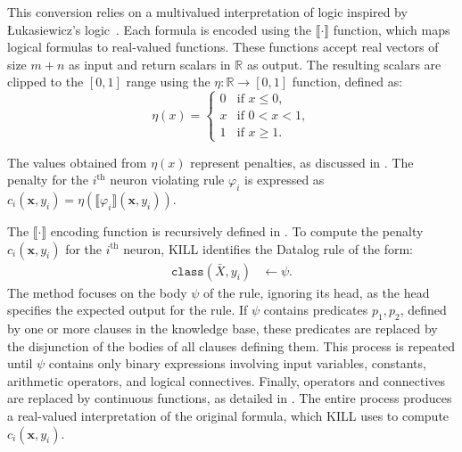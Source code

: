 This conversion relies on a multivalued interpretation of logic inspired by \L{}ukasiewicz's logic~\cite{DBLP:journals/jsyml/Hay63}.
%
Each formula is encoded using the \(\llbracket \cdot \rrbracket\) function, which maps logical formulas to real-valued functions.
%
These functions accept real vectors of size \(m + n\) as input and return scalars in \(\mathbb{R}\) as output.
%
The resulting scalars are clipped to the \([0, 1]\) range using the \(\eta : \mathbb{R} \to [0, 1]\) function, defined as:
%
\begin{equation}
    \label{eq:eta-function}
    \eta(x) =
    \begin{cases}
        0 & \text{if } x \leq 0, \\
        x & \text{if } 0 < x < 1, \\
        1 & \text{if } x \geq 1.
    \end{cases}
\end{equation}

The values obtained from \(\eta(x)\) represent penalties, as discussed in .
%
The penalty for the \(i^{\text{th}}\) neuron violating rule \(\varphi_i\) is expressed as \(c_i(\mathbf{x}, y_i) = \eta(\llbracket \varphi_i \rrbracket(\mathbf{x}, y_i))\).

The \(\llbracket \cdot \rrbracket\) encoding function is recursively defined in .
%
To compute the penalty \(c_i(\mathbf{x}, y_i)\) for the \(i^{\text{th}}\) neuron, \gls{KILL} identifies the Datalog rule of the form:
%
\begin{align*}
    \texttt{class}(\bar{X}, y_i) &\leftarrow \psi.
\end{align*}
%
The method focuses on the body \(\psi\) of the rule, ignoring its head, as the head specifies the expected output for the rule.
%
If \(\psi\) contains predicates \(p_1, p_2\), defined by one or more clauses in the knowledge base, these predicates are replaced by the disjunction of the bodies of all clauses defining them.
%
This process is repeated until \(\psi\) contains only binary expressions involving input variables, constants, arithmetic operators, and logical connectives.
%
Finally, operators and connectives are replaced by continuous functions, as detailed in .
%
The entire process produces a real-valued interpretation of the original formula, which \gls{KILL} uses to compute \(c_i(\mathbf{x}, y_i)\).

